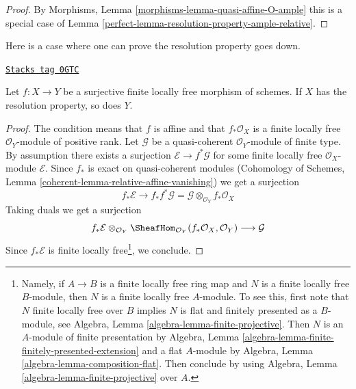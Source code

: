 \begin{proof}

By Morphisms, Lemma \ref{morphisms-lemma-quasi-affine-O-ample}
this is a special case of
Lemma \ref{perfect-lemma-resolution-property-ample-relative}.
\end{proof}

Here is a case where one can prove the resolution property goes down.

\begin{lemma}
\label{perfect-lemma-resolution-property-goes-down-finite-flat}
\href{https://stacks.math.columbia.edu/tag/0GTC}{\texttt{Stacks tag 0GTC}}

Let $f : X \to Y$ be a surjective finite locally free morphism of schemes.
If $X$ has the resolution property, so does $Y$.
\end{lemma}

\begin{proof}
The condition means that $f$ is affine and that $f_*\mathcal{O}_X$
is a finite locally free $\mathcal{O}_Y$-module of positive rank.
Let $\mathcal{G}$ be a quasi-coherent $\mathcal{O}_Y$-module
of finite type. By assumption there exists a surjection
$\mathcal{E} \to f^*\mathcal{G}$ for some finite locally free
$\mathcal{O}_X$-module $\mathcal{E}$. Since $f_*$ is exact on
quasi-coherent modules
(Cohomology of Schemes, Lemma \ref{coherent-lemma-relative-affine-vanishing})
we get a surjection
$$
f_*\mathcal{E}
\longrightarrow
f_*f^*\mathcal{G} = \mathcal{G} \otimes_{\mathcal{O}_Y} f_*\mathcal{O}_X
$$
Taking duals we get a surjection
$$
f_*\mathcal{E}
\otimes_{\mathcal{O}_Y}
\SheafHom_{\mathcal{O}_Y}(f_*\mathcal{O}_X, \mathcal{O}_Y)
\longrightarrow
\mathcal{G}
$$
Since $f_*\mathcal{E}$ is finite locally free\footnote{Namely,
if $A \to B$ is a finite locally free ring map
and $N$ is a finite locally free $B$-module, then $N$
is a finite locally free $A$-module. To see this, first note
that $N$ finite locally free over $B$ implies $N$ is
flat and finitely presented as a $B$-module, see
Algebra, Lemma \ref{algebra-lemma-finite-projective}. Then
$N$ is an $A$-module of finite presentation by
Algebra, Lemma \ref{algebra-lemma-finite-finitely-presented-extension}
and a flat $A$-module by Algebra, Lemma \ref{algebra-lemma-composition-flat}.
Then conclude by using
Algebra, Lemma \ref{algebra-lemma-finite-projective} over $A$.},
we conclude.
\end{proof}

